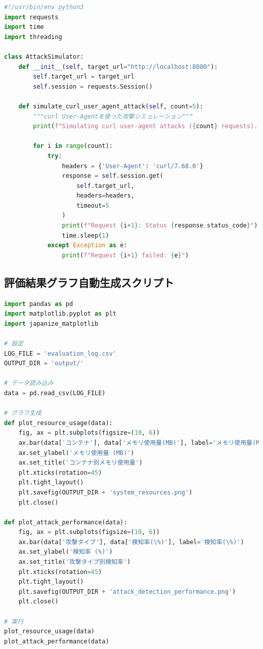 \documentclass[12pt,a4paper]{article}
\begin{document}
\begin{lstlisting}[language=python, caption=attack\_simulator.py（抜粋）]
#!/usr/bin/env python3
import requests
import time
import threading

class AttackSimulator:
    def __init__(self, target_url="http://localhost:8080"):
        self.target_url = target_url
        self.session = requests.Session()
        
    def simulate_curl_user_agent_attack(self, count=5):
        """curl User-Agentを使った攻撃シミュレーション"""
        print(f"Simulating curl user-agent attacks ({count} requests)...")
        
        for i in range(count):
            try:
                headers = {'User-Agent': 'curl/7.68.0'}
                response = self.session.get(
                    self.target_url, 
                    headers=headers, 
                    timeout=5
                )
                print(f"Request {i+1}: Status {response.status_code}")
                time.sleep(1)
            except Exception as e:
                print(f"Request {i+1} failed: {e}")
\end{lstlisting}

\subsection{評価結果グラフ自動生成スクリプト}

\begin{lstlisting}[language=python, caption=generate\_evaluation\_graphs.py（抜粋）]
import pandas as pd
import matplotlib.pyplot as plt
import japanize_matplotlib

# 設定
LOG_FILE = 'evaluation_log.csv'
OUTPUT_DIR = 'output/'

# データ読み込み
data = pd.read_csv(LOG_FILE)

# グラフ生成
def plot_resource_usage(data):
    fig, ax = plt.subplots(figsize=(10, 6))
    ax.bar(data['コンテナ'], data['メモリ使用量(MB)'], label='メモリ使用量(MB)')
    ax.set_ylabel('メモリ使用量 (MB)')
    ax.set_title('コンテナ別メモリ使用量')
    plt.xticks(rotation=45)
    plt.tight_layout()
    plt.savefig(OUTPUT_DIR + 'system_resources.png')
    plt.close()

def plot_attack_performance(data):
    fig, ax = plt.subplots(figsize=(10, 6))
    ax.bar(data['攻撃タイプ'], data['検知率(\%)'], label='検知率(\%)')
    ax.set_ylabel('検知率 (%)')
    ax.set_title('攻撃タイプ別検知率')
    plt.xticks(rotation=45)
    plt.tight_layout()
    plt.savefig(OUTPUT_DIR + 'attack_detection_performance.png')
    plt.close()

# 実行
plot_resource_usage(data)
plot_attack_performance(data)
\end{lstlisting}
\end{document}
